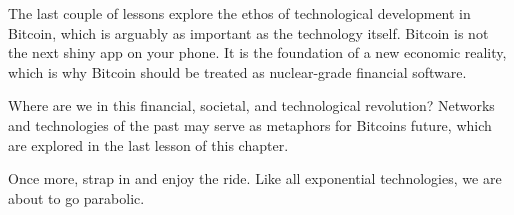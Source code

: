 The last couple of lessons explore the ethos of technological development in
Bitcoin, which is arguably as important as the technology itself. Bitcoin is not
the next shiny app on your phone. It is the foundation of a new economic
reality, which is why Bitcoin should be treated as nuclear-grade financial
software.

Where are we in this financial, societal, and technological revolution? Networks
and technologies of the past may serve as metaphors for Bitcoins future, which
are explored in the last lesson of this chapter.

Once more, strap in and enjoy the ride. Like all exponential technologies, we
are about to go parabolic.
